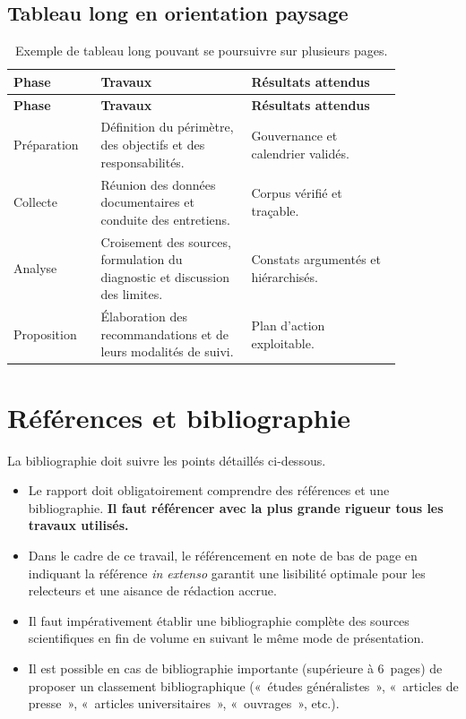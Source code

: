 \documentclass[12pt,a4paper]{article}
\begin{document}
\begin{landscape}
\section{Tableau long en orientation paysage}
\StyledTableSetup
\begin{longtable}{@{}p{0.18\linewidth}p{0.34\linewidth}p{0.34\linewidth}@{}}
    \caption{Exemple de tableau long pouvant se poursuivre sur plusieurs pages.}
    \label{tab:exemple-long} \\
    \toprule
    \textbf{Phase} & \textbf{Travaux} & \textbf{Résultats attendus} \\
    \midrule
    \endfirsthead
    \toprule
    \textbf{Phase} & \textbf{Travaux} & \textbf{Résultats attendus} \\
    \midrule
    \endhead
    Préparation & Définition du périmètre, des objectifs et des responsabilités. & Gouvernance et calendrier validés. \\
    Collecte & Réunion des données documentaires et conduite des entretiens. & Corpus vérifié et traçable. \\
    Analyse & Croisement des sources, formulation du diagnostic et discussion des limites. & Constats argumentés et hiérarchisés. \\
    Proposition & Élaboration des recommandations et de leurs modalités de suivi. & Plan d'action exploitable. \\
    \bottomrule
\end{longtable}
\end{landscape}

\newpage

\section{Références et bibliographie}

La bibliographie doit suivre les points détaillés ci-dessous.

\begin{itemize}

  \item Le rapport doit obligatoirement comprendre des références et une bibliographie. \textbf{Il faut référencer avec la plus grande rigueur tous les travaux utilisés.}
  \item Dans le cadre de ce travail, le référencement en note de bas de page en indiquant la référence \textit{in extenso} garantit une lisibilité optimale pour les relecteurs et une aisance de rédaction accrue.
  \item Il faut impérativement établir une bibliographie complète des sources scientifiques en fin de volume en suivant le même mode de présentation.
  \item Il est possible en cas de bibliographie importante (supérieure à 6~pages) de proposer un classement bibliographique («~études généralistes~», «~articles de presse~», «~articles universitaires~», «~ouvrages~», etc.).
\end{itemize}
\end{document}
